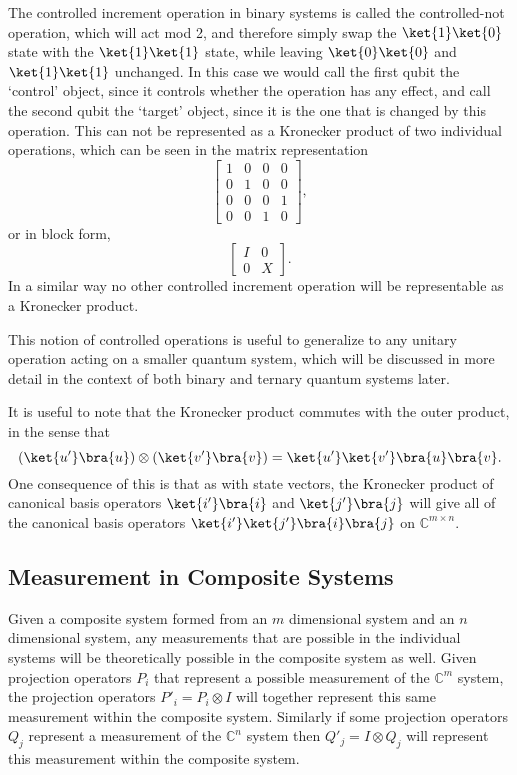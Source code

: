The controlled increment operation in binary systems is called the controlled-not operation, which will act mod 2, and therefore simply swap the $\ket{1}\ket{0}$ state with the $\ket{1}\ket{1}$ state, while leaving $\ket{0}\ket{0}$ and $\ket{1}\ket{1}$ unchanged. In this case we would call the first qubit the `control' object, since it controls whether the operation has any effect, and call the second qubit the `target' object, since it is the one that is changed by this operation. This can not be represented as a Kronecker product of two individual operations, which can be seen in the matrix representation
\[
\left[\begin{matrix}
1&0&0&0\\
0&1&0&0\\
0&0&0&1\\
0&0&1&0
\end{matrix}\right],
\]
or in block form,
\[\begin{bmatrix}
I & 0 \\
0 & X
\end{bmatrix}.\]
In a similar way no other controlled increment operation will be representable as a Kronecker product.

This notion of controlled operations is useful to generalize to any unitary operation acting on a smaller quantum system, which will be discussed in more detail in the context of both binary and ternary quantum systems later.

It is useful to note that the Kronecker product commutes with the outer product, in the sense that
\[(\ket{u'}\bra{u})\otimes(\ket{v'}\bra{v}) = \ket{u'}\ket{v'}\bra{u}\bra{v}.\]
One consequence of this is that as with state vectors, the Kronecker product of canonical basis operators $\ket{i'}\bra{i}$ and $\ket{j'}\bra{j}$ will give all of the canonical basis operators $\ket{i'}\ket{j'}\bra{i}\bra{j}$ on $\mathbb{C}^{m \times n}$.
\subsection{Measurement in Composite Systems}\label{composite-measurement}
Given a composite system formed from an $m$ dimensional system and an $n$ dimensional system, any measurements that are possible in the individual systems will be theoretically possible in the composite system as well. Given projection operators $P_i$ that represent a possible measurement of the $\mathbb{C}^m$ system, the projection operators $P'_i = P_i \otimes I$ will together represent this same measurement within the composite system. Similarly if some projection operators $Q_j$ represent a measurement of the $\mathbb{C}^n$ system then $Q'_j = I\otimes Q_j$ will represent this measurement within the composite system.

